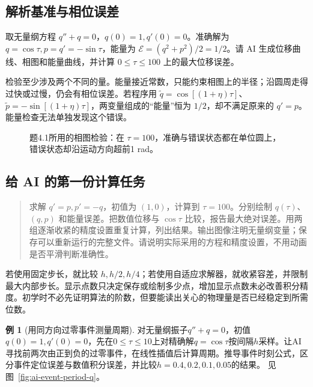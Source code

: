 \documentclass[11pt,openany,fontset=fandol]{ctexbook}
\theoremstyle{plain}\newtheorem{theorem}{定理}[chapter]\newtheorem{proposition}[theorem]{命题}
\theoremstyle{definition}\newtheorem{definition}{定义}[chapter]\newtheorem{example}{例}[chapter]
\theoremstyle{remark}\newtheorem*{remark}{说明}
\begin{document}
\subsection{解析基准与相位误差}
取无量纲方程 $q''+q=0$，$q(0)=1,q'(0)=0$。准确解为 $q=\cos\tau,p=q'=-\sin\tau$，能量为 $\mathcal E=(q^2+p^2)/2=1/2$。请 AI 生成位移曲线、相图和能量曲线，并计算 $0\le\tau\le100$ 上的最大位移误差。

检验至少涉及两个不同的量。能量接近常数，只能约束相图上的半径；沿圆周走得过快或过慢，仍会有相位误差。若程序用 $\widetilde q=\cos[(1+\eta)\tau]$、$\widetilde p=-\sin[(1+\eta)\tau]$，两变量组成的“能量”恒为 $1/2$，却不满足原来的 $q'=p$。能量检查无法单独发现这个错误。

\begin{figure}[H]\centering
{}
\caption{题4.1所用的相图检验：在 $\tau=100$，准确与错误状态都在单位圆上，错误状态却沿运动方向超前1 rad。}\label{fig:phase-error}
\end{figure}

\subsection{给 AI 的第一份计算任务}
\begin{quote}\small
求解 $q'=p,p'=-q$，初值为 $(1,0)$，计算到 $\tau=100$。分别绘制 $q(\tau)$、$(q,p)$ 和能量误差。把数值位移与 $\cos\tau$ 比较，报告最大绝对误差。用两组逐渐收紧的精度设置重复计算，列出结果。输出图像注明无量纲变量；保存可以重新运行的完整文件。请说明实际采用的方程和精度设置，不用动画是否平滑判断准确性。
\end{quote}

若使用固定步长，就比较 $h,h/2,h/4$；若使用自适应求解器，就收紧容差，并限制最大内部步长。显示点数只决定保存或绘制多少点，增加显示点数未必改善积分精度。初学时不必先证明算法的阶数，但要能读出关心的物理量是否已经稳定到所需位数。


\begin{example}[用同方向过零事件测量周期]\label{ex:ai-event-period}
对无量纲振子$q''+q=0$，初值$q(0)=1,q'(0)=0$，先在$0\le\tau\le10$上对精确解$q=\cos\tau$按间隔$h$采样。让AI寻找前两次由正到负的过零事件，在线性插值后计算周期。推导事件时刻公式，区分事件定位误差与数值积分误差，并比较$h=0.4,0.2,0.1,0.05$的结果。 见图~\ref{fig:ai-event-period-q}。
\end{example}
\end{document}
